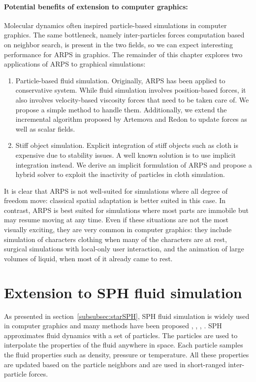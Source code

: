 \paragraph*{Potential benefits of extension to computer graphics:}
Molecular dynamics often inspired particle-based simulations in computer graphics. The same bottleneck, namely inter-particles forces computation based on neighbor search, is present in the two fields, so we can expect interesting performance for ARPS in graphics. The remainder of this chapter explores two applications of ARPS to graphical simulations:
\begin{enumerate}
\item Particle-based fluid simulation. Originally, ARPS has been applied to conservative system. While fluid simulation involves position-based forces, it also involves velocity-based viscosity forces that need to be taken care of. We propose a simple method to handle them. Additionally, we extend the incremental algorithm proposed by Artemova and Redon to update forces as well as scalar fields.
\item Stiff object simulation. Explicit integration of stiff objects such as cloth is expensive due to stability issues. A well known solution is to use implicit integration instead. We derive an implicit formulation of ARPS and propose a hybrid solver to exploit the inactivity of particles in cloth simulation.
\end{enumerate}
It is clear that ARPS is not well-suited for simulations where all degree of freedom move: classical spatial adaptation is better suited in this case. In contrast, ARPS is best suited for simulations where most parts are immobile but may resume moving at any time. Even if these situations are not the most visually exciting, they are very common in computer graphics: they include simulation of characters clothing when many of the characters are at rest, surgical simulations with local-only user interaction, and the animation of large volumes of liquid, when most of it already came to rest.

\section{ Extension to SPH fluid simulation } 
\label{sec:arps_sph}
As presented in section~\ref{subsubsec:starSPH}, SPH fluid simulation is widely used in computer graphics and many methods have been proposed \cite{Desbrun1996}, \cite{Muller2003}, \cite{Solenthaler2009}, \cite{Ihmsen2014:IISPH}.
SPH approximates fluid dynamics with a set of particles.
The particles are used to interpolate the properties of the fluid anywhere in space.
Each particle samples the fluid properties such as density, pressure or temperature. All these properties are updated based on the particle neighbors and are
used in short-ranged inter-particle forces.
